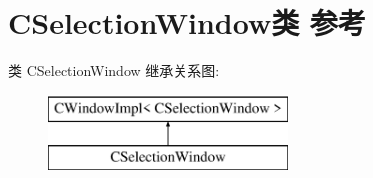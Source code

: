 \hypertarget{class_c_selection_window}{}\section{C\+Selection\+Window类 参考}
\label{class_c_selection_window}
类 C\+Selection\+Window 继承关系图\+:\begin{figure}[H]
\begin{center}
\leavevmode
\includegraphics[height=2.000000cm]{class_c_selection_window}
\end{center}
\end{figure}
